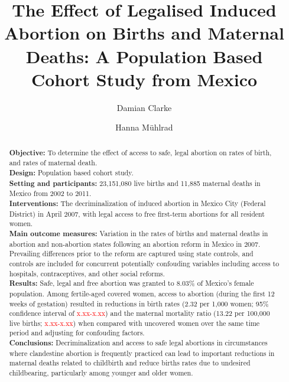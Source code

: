 \documentclass[a4paper, 11pt]{article}
\title{The Effect of Legalised Induced Abortion on Births and Maternal Deaths: 
A Population Based Cohort Study from Mexico}
\author[1]{Damian Clarke}
\author[2]{Hanna Mühlrad}
\affil[2]{University of Gothenburg \\
  \url{hanna.muhlrad@gu.se}}
\affil[1]{University of Oxford \\
  \url{damian.clarke@economics.ox.ac.uk}}
\begin{document}
\begin{spacing}{1.25}


\maketitle
\begin{abstract}
\noindent \textbf{Objective:} To determine the effect of access to safe, legal 
abortion on rates of birth, and rates of maternal death.\\
\textbf{Design:} Population based cohort study. \\
\textbf{Setting and participants:} 23,151,080 live births and 11,885 maternal 
deaths in Mexico from 2002 to 2011. \\
\textbf{Interventions:} The decriminalization of induced abortion in Mexico City 
(Federal District) in April 2007, with legal access to free first-term abortions
for all resident women. \\
\textbf{Main outcome measures:} Variation in the rates of births and maternal 
deaths in abortion and non-abortion states following an abortion reform in Mexico 
in 2007.  Prevailing differences prior to the reform are captured using state 
controls, and controls are included for concurrent potentially confouding 
variables including access to hospitals, contraceptives, and other social 
reforms.\\
\textbf{Results:} Safe, legal and free abortion was granted to 8.03\% of Mexico's
female population.  Among fertile-aged covered women, access to abortion (during 
the first 12 weeks of gestation) resulted in reductions in birth rates (2.32 per 
1,000 women; 95\% confidence interval of \textcolor{red}{x.xx-x.xx}) and the 
maternal mortality ratio (13.22 per 100,000 live births; 
\textcolor{red}{x.xx-x.xx}) when compared with uncovered women over the same 
time period and adjusting for confouding factors. \\
\textbf{Conclusions:} Decriminalization and access to safe legal abortions in 
circumstances where clandestine abortion is frequently practiced can lead to 
important reductions in maternal deaths related to childbirth and reduce births
rates due to undesired childbearing, particularly among younger and older women.
\end{abstract}

 
\end{spacing}
\end{document}
